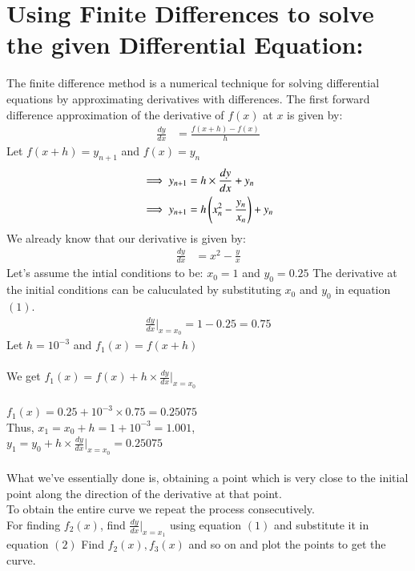 \documentclass[journal]{IEEEtran}
\begin{document}
\section*{Using Finite Differences to solve the given Differential Equation: }
The finite difference method is a numerical technique for solving differential equations by approximating derivatives with differences.
The first forward difference approximation of the derivative of $f(x)$ at $x$ is given by:
\begin{align}
    \frac{dy}{dx}&=\frac{f(x+h)-f(x)}{h}
\end{align}
Let $f(x+h)=y_{n+1}$ and $f(x)=y_n$
\begin{align}
    \implies y_{n+1}&=h\times\frac{dy}{dx}+y_n\\
    \implies y_{n+1}&=h\left(x_n^2-\frac{y_n}{x_n}\right)+y_n
\end{align}
We already know that our derivative is given by:
\begin{align}
\frac{dy}{dx}&=x^2-\frac{y}{x}
\end{align}
Let's assume the intial conditions to be: $x_0=1$ and $y_0=0.25$
The derivative at the initial conditions can be caluculated by substituting $x_0$ and $y_0$ in equation $(1)$.\\
\begin{align}
\frac{dy}{dx}|_{x=x_0}=1-0.25 =0.75
\end{align}
Let $h=10^{-3}$ and $f_1(x)=f(x+h)$\\\\
We get $f_1(x)=f(x)+h\times\frac{dy}{dx}|_{x=x_0} $\\\\
$f_1(x)=0.25+10^{-3}\times0.75=0.25075$\\
Thus, $x_1=x_0+h=1+10^{-3}=1.001$,\\$y_1=y_0+h\times\frac{dy}{dx}|_{x=x_0}=0.25075$\\\\
What we've essentially done is, obtaining a point which is very close to the initial point along the direction of the derivative at that point.\\To obtain the entire curve we repeat the process consecutively.\\For finding $f_2(x)$, find $\frac{dy}{dx}|_{x=x_1}$ using equation $(1)$ and substitute it in equation $(2)$ Find $f_2(x), f_3(x)$ and so on and plot the points to get the curve.
\end{document}

